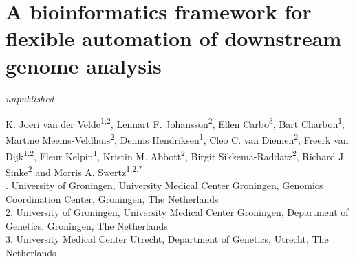 \chapter[A bioinf. framework for downstream genome analysis]{A bioinformatics framework for flexible automation of downstream genome analysis}
\label{chap:frameworkforgenomics}

{ \Large {} }

\hfill \textsl{unpublished}

\newpage

\noindent
K. Joeri van der Velde\textsuperscript{1,2}, Lennart F. Johansson\textsuperscript{2}, Ellen Carbo\textsuperscript{3}, Bart Charbon\textsuperscript{1}, Martine Meems-Veldhuis\textsuperscript{2}, Dennis Hendriksen\textsuperscript{1}, Cleo C. van Diemen\textsuperscript{2}, Freerk van Dijk\textsuperscript{1,2}, Fleur Kelpin\textsuperscript{1}, Kristin M. Abbott\textsuperscript{2}, Birgit Sikkema-Raddatz\textsuperscript{2}, Richard J. Sinke\textsuperscript{2} and Morris A. Swertz\textsuperscript{1,2,*}\\

. University of Groningen, University Medical Center Groningen, Genomics Coordination Center, Groningen, The Netherlands\\
2. University of Groningen, University Medical Center Groningen, Department of Genetics, Groningen, The Netherlands\\
3. University Medical Center Utrecht, Department of Genetics, Utrecht, The Netherlands\\

